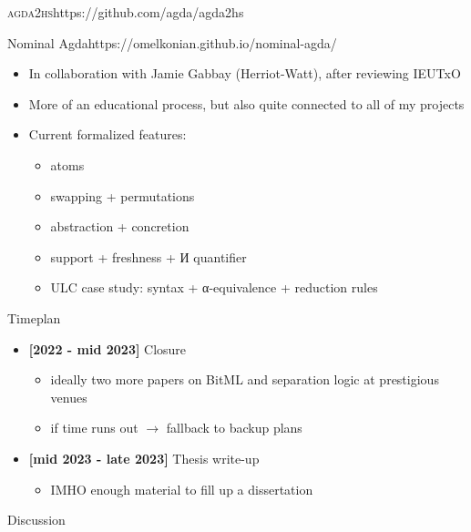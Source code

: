 \documentclass[aspectratio=169]{beamer}
\renewcommand\alert[1]{\textcolor{mLightBrown}{#1}}
\newcommand\agdatohs{\textsc{agda2hs}\xspace}
\begin{document}
\newcommand\citeagda[1]{%
\textbf{#1}\\
\small{Reasonable Agda is Correct Haskell: Writing Verified Haskell using \agdatohs}
}

\begin{frame}{\agdatohs\hfill\alert{https://github.com/agda/agda2hs}}
\begin{center}
\end{center}
\end{frame}

\begin{frame}{Nominal Agda\hfill\alert{https://omelkonian.github.io/nominal-agda/}}
\begin{itemize}
\item In collaboration with Jamie Gabbay (Herriot-Watt), after reviewing IEUTxO
\item More of an educational process, but also quite connected to all of my projects
\item Current formalized features:
  \begin{itemize}
  \item atoms
  \item swapping + permutations
  \item abstraction + concretion
  \item support + freshness + И quantifier
  \item ULC case study: syntax + α-equivalence + reduction rules
  \end{itemize}
\end{itemize}
\end{frame}

\begin{frame}{Timeplan}
\begin{itemize}
\item \textbf{[2022 - mid 2023]} Closure
  \begin{itemize}
  \item ideally two more papers on BitML and separation logic at prestigious venues
  \item if time runs out $\to$ fallback to backup plans
  \end{itemize}
\item \textbf{[mid 2023 - late 2023]} Thesis write-up
  \begin{itemize}
  \item IMHO enough material to fill up a dissertation
  \end{itemize}
\end{itemize}
\end{frame}

\begin{frame}[standout]
Discussion
\end{frame}
\end{document}
